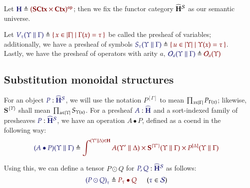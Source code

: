 \documentclass[11pt]{article}
\theoremstyle{definition}
\theoremstyle{remark}
\numberwithin{equation}{section}
\newcommand\HypCat{\mathbf{H}}
\begin{document}
Let $\Define{\HypCat}{\OpCat{(\SCtx\times\Ctx)}}$; then we fix the functor
category $\widehat{\HypCat}^\Sorts$ as our semantic universe.

Let $\Define{V_\tau(\Upsilon\parallel\Gamma)}{\MkSet{x\in\Dom\Gamma\mid
    \Gamma(x)=\tau}}$ be called the presheaf of variables; additionally, we have
a presheaf of symbols
$\Define{S_\tau(\Upsilon\parallel\Gamma)}{\MkSet{u\in\Dom\Upsilon\mid
    \Upsilon(x)=\tau}}$. Lastly, we have the presheaf of operators with arity
$a$,
$\Define{\Operators_a(\Upsilon\parallel\Gamma)}{\Operators_a(\Upsilon)}$

\subsection{Substitution monoidal structures}
\newcommand\SymPsh{\mathbf{S}}
\newcommand\VarPsh{\mathbf{V}}

For an object $\Of{P}{\widehat{\HypCat}^\Sorts}$, we will use the notation
$P^{[\Gamma]}$ to mean $\prod_{x\in\left\vert\Gamma\right\vert}P_{\Gamma(x)}$; likewise,
$\SymPsh^{\{\Upsilon\}}$ shall mean $\prod_{u\in\left\vert\Upsilon\right\vert}S_{\Upsilon(u)}$. For a
presheaf $\Of{A}{\widehat{\HypCat}}$ and a sort-indexed family of presheaves
$\Of{P}{\widehat{\HypCat}^\Sorts}$, we have an operation $A\bullet P$, defined
as a coend in the following way:
\[
  \Define{(A\bullet P)(\Upsilon\parallel\Gamma)}{
    \int^{(\Upsilon'\parallel\Delta)\in\HypCat}
      A(\Upsilon'\parallel\Delta)
      \times \SymPsh^{\{\Upsilon'\}}(\Upsilon\parallel\Gamma)
      \times P^{[\Delta]}(\Upsilon\parallel\Gamma)
  }
\]

Using this, we can define a tensor $P\odot Q$ for
$\Of{P,Q}{\widehat{\HypCat}^\Sorts}$ as follows:
\[
  \HypJ{
    \Define{{(P\odot Q)}_{\tau}}{
      P_\tau\bullet Q
    }
\quad
  }{
    \Member{\tau}{\Sorts}
  }
\]
\end{document}
